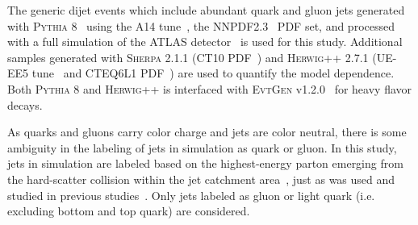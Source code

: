 The generic dijet events which include abundant quark and gluon jets generated with \textsc{Pythia} 8~\cite{Pythia,Pythia8} using the A14 tune~\cite{ATL-PHYS-PUB-2014-021}, the NNPDF2.3~\cite{Ball:2014uwa} PDF set, and processed with a full simulation of the ATLAS detector~\cite{Agostinelli:2002hh,Aad:2010ah} is used for this study.  Additional samples generated with \textsc{Sherpa} 2.1.1 (CT10 PDF~\cite{Gao:2013xoa}) and \textsc{Herwig++} 2.7.1 (UE-EE5 tune~\cite{Seymour:2013qka} and CTEQ6L1 PDF~\cite{Stump:2003yu}) are used to quantify the model dependence. Both \textsc{Pythia} 8 and \textsc{Herwig++} is interfaced with \textsc{EvtGen} v1.2.0~\cite{Lange:2001uf} for heavy flavor decays.

As quarks and gluons carry color charge and jets are color neutral, 
there is some ambiguity in the labeling of jets in simulation as quark or gluon.
In this study, jets in simulation are 
labeled based on the highest-energy parton emerging from the hard-scatter collision within the jet catchment area~\cite{jetareas}, 
just as was used and studied in previous studies~\cite{ATL-PHYS-PUB-2017-009}.
Only jets labeled as gluon or light quark (i.e. excluding bottom and top quark) are considered.
